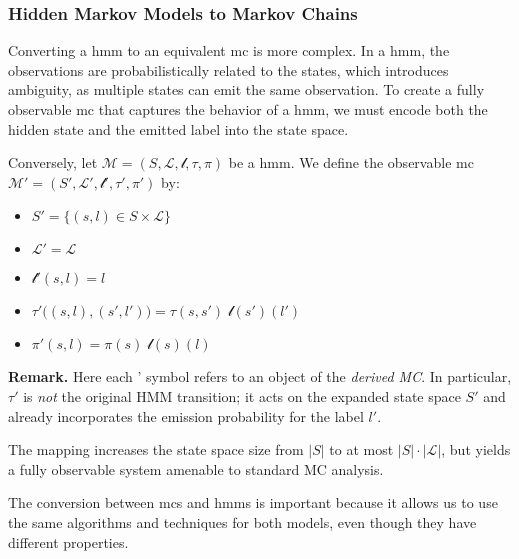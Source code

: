 \subsubsection{Hidden Markov Models to Markov Chains}\label{subsec:hmm2mc}
Converting a \gls{hmm} to an equivalent \gls{mc} is more complex.
In a \gls{hmm}, the observations are probabilistically related to the states, which introduces ambiguity, as multiple states can emit the same observation.
To create a fully observable \gls{mc} that captures the behavior of a \gls{hmm}, we must encode both the hidden state and the emitted label into the state space.
\begin{definition}
    Conversely, let
    \(
    \mathcal{M}
    = (S, \mathcal{L}, \mathscr{l}, \tau, \pi)
    \)
    be a \gls{hmm}.
    We define the observable \gls{mc}
    \(
    \mathcal{M}'
    = (S', \mathcal{L}', \mathscr{l}', \tau', \pi')
    \)
    by:
    \begin{itemize}
        \item $S' = \{(s,l)\in S\times\mathcal{L}\}$%
        \item $\mathcal{L}' = \mathcal{L}$%
        \item $\mathscr{l}'(s,l) = l$%
        \item $\tau'\big((s,l),(s',l')\big) = \tau(s,s')\;\mathscr{l}(s')(l')$%
        \item $\pi'(s,l) = \pi(s)\;\mathscr{l}(s)(l)$%
    \end{itemize}
    \textbf{Remark.}
    Here each ' symbol refers to an object of the \emph{derived MC}.  In
    particular, $\tau'$ is \emph{not} the original HMM transition; it acts on the
    expanded state space $S'$ and already incorporates the emission probability for
    the label $l'$.

    The mapping increases the state space size from $|S|$ to at most
    $|S|\cdot|\mathcal{L}|$, but yields a fully observable system amenable to
    standard MC analysis.
\end{definition}

The conversion between \glspl{mc} and \glspl{hmm} is important because it allows us to use the same algorithms and techniques for both models, even though they have different properties.
